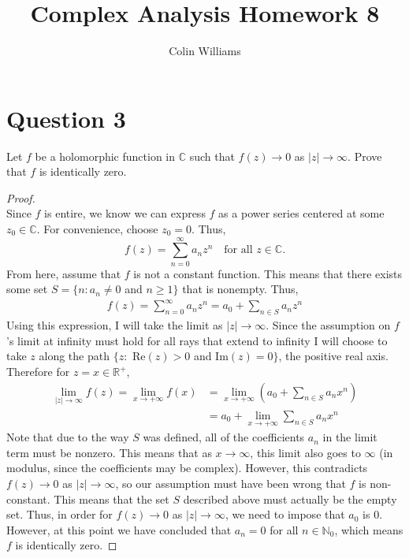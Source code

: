 \documentclass[10pt,a4paper]{article}
\title{Complex Analysis Homework 8}
\author{Colin Williams}
\theoremstyle{definition}
\begin{document}
\maketitle

\section*{Question 3}
Let $f$ be a holomorphic function in $\mathbb{C}$ such that $f(z) \to 0$ as $|z| \to \infty$. Prove that $f$ is identically zero.

\begin{proof}{$ $}
\\Since $f$ is entire, we know we can express $f$ as a power series centered at some $z_0 \in \mathbb{C}$. For convenience, choose $z_0 = 0$. Thus, 
\[f(z) = \sum_{n = 0}^{\infty} a_nz^n \quad \text{for all $z \in \mathbb{C}$.}\]
From here, assume that $f$ is not a constant function. This means that there exists some set $S = \{n: a_n \neq 0$ and $n \geq 1\}$ that is nonempty. Thus,
\begin{align*}
f(z) = \sum_{n = 0}^{\infty} a_nz^n = a_0 + \sum_{n \in S}a_nz^n
\end{align*}
Using this expression, I will take the limit as $|z| \to \infty$. Since the assumption on $f$'s limit at infinity must hold for all rays that extend to infinity I will choose to take $z$ along the path $\{z: $ Re$(z) > 0$ and Im$(z) = 0\}$, the positive real axis. Therefore for $z = x \in \mathbb{R}^+$,
\begin{align*}
\lim_{|z| \to \infty} f(z) = \lim_{x \to +\infty} f(x) &= \lim_{x \to +\infty}\left(a_0 + \sum_{n \in S}a_nx^n\right)\\
&= a_0 + \lim_{x \to +\infty}\sum_{n \in S}a_nx^n
\end{align*}
Note that due to the way $S$ was defined, all of the coefficients $a_n$ in the limit term must be nonzero. This means that as $x \to \infty$, this limit also goes to $\infty$ (in modulus, since the coefficients may be complex). However, this contradicts $f(z) \to 0$ as $|z| \to \infty$, so our assumption must have been wrong that $f$ is non-constant. This means that the set $S$ described above must actually be the empty set. Thus, in order for $f(z) \to 0$ as $|z| \to \infty$, we need to impose that $a_0$ is 0. However, at this point we have concluded that $a_n = 0$ for all $n \in \mathbb{N}_0$, which means $f$ is identically zero.
\end{proof}
\end{document}
